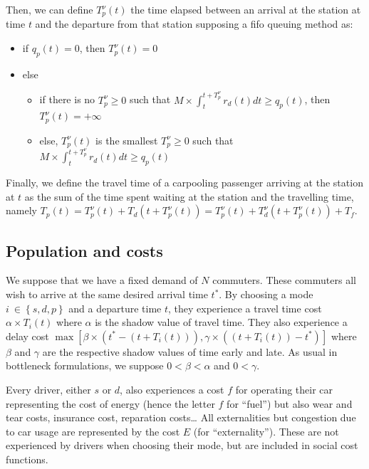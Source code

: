 \documentclass[english, a4paper]{article}
\theoremstyle{plain}
\theoremstyle{definition}
\theoremstyle{remark}
\begin{document}
Then, we can define $T^{\nu}_p(t)$ the time elapsed between an arrival at the station at time $t$ and the departure from that station supposing a \acrfull{fifo} queuing method as:

\begin{itemize}
    \item if $q_p(t) = 0$, then $T^{\nu}_p(t) = 0$
    \item else
    \begin{itemize}
        \item if there is no $T_p^{\nu} \geq 0$ such that $M \times \int_{t}^{t+T_p^{\nu}} r_d(t) dt \geq q_p(t)$, then $T^{\nu}_p(t) = +\infty$
        \item else, $T^{\nu}_p(t)$ is the smallest $T_p^{\nu} \geq 0$ such that $M \times \int_{t}^{t + T_p^{\nu}} r_d(t) dt \geq q_p(t)$
    \end{itemize}
\end{itemize}

Finally, we define the travel time of a carpooling passenger arriving at the station at $t$ as the sum of the time spent waiting at the station and the travelling time, namely $T_p(t) = T^{\nu}_p(t) + T_d(t + T^{\nu}_p(t)) = T^{\nu}_p(t) + T^{\nu}_d(t + T^{\nu}_p(t)) + T_f$.


\subsection{Population and costs}

We suppose that we have a fixed demand of $N$ commuters. These commuters all wish to arrive at the same desired arrival time $t^*$. By choosing a mode $i\ \in \left\{ s, d, p \right\}$ and a departure time $t$, they experience a travel time cost $\alpha \times T_i(t)$ where $\alpha$ is the shadow value of travel time. They also experience a delay cost $\max [\beta \times (t^* - (t + T_i(t))), \gamma \times ((t + T_i(t)) - t^*)]$ where $\beta$ and $\gamma$ are the respective shadow values of time early and late. As usual in bottleneck formulations, we suppose $0 < \beta < \alpha$ and $0 < \gamma$. 

Every driver, either $s$ or $d$, also experiences a cost $f$ for operating their car representing the cost of energy (hence the letter $f$ for ``fuel'') but also wear and tear costs, insurance cost, reparation costs… All externalities but congestion due to car usage are represented by the cost $E$ (for ``externality''). These are not experienced by drivers when choosing their mode, but are included in social cost functions. 
\end{document}
